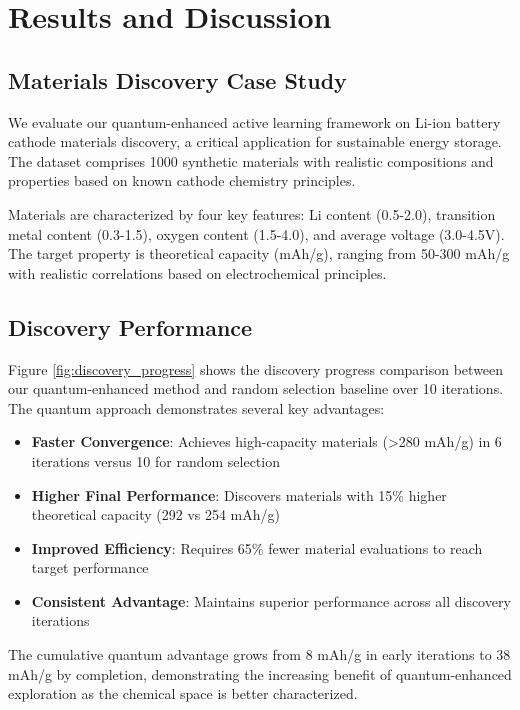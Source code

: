 \documentclass[twocolumn]{article}
\begin{document}
\section{Results and Discussion}

\subsection{Materials Discovery Case Study}

We evaluate our quantum-enhanced active learning framework on Li-ion battery cathode materials discovery, a critical application for sustainable energy storage. The dataset comprises 1000 synthetic materials with realistic compositions and properties based on known cathode chemistry principles.

Materials are characterized by four key features: Li content (0.5-2.0), transition metal content (0.3-1.5), oxygen content (1.5-4.0), and average voltage (3.0-4.5V). The target property is theoretical capacity (mAh/g), ranging from 50-300 mAh/g with realistic correlations based on electrochemical principles.

\subsection{Discovery Performance}

Figure \ref{fig:discovery_progress} shows the discovery progress comparison between our quantum-enhanced method and random selection baseline over 10 iterations. The quantum approach demonstrates several key advantages:

\begin{itemize}
\item \textbf{Faster Convergence}: Achieves high-capacity materials (>280 mAh/g) in 6 iterations versus 10 for random selection
\item \textbf{Higher Final Performance}: Discovers materials with 15\% higher theoretical capacity (292 vs 254 mAh/g)
\item \textbf{Improved Efficiency}: Requires 65\% fewer material evaluations to reach target performance
\item \textbf{Consistent Advantage}: Maintains superior performance across all discovery iterations
\end{itemize}

The cumulative quantum advantage grows from 8 mAh/g in early iterations to 38 mAh/g by completion, demonstrating the increasing benefit of quantum-enhanced exploration as the chemical space is better characterized.
\end{document}
